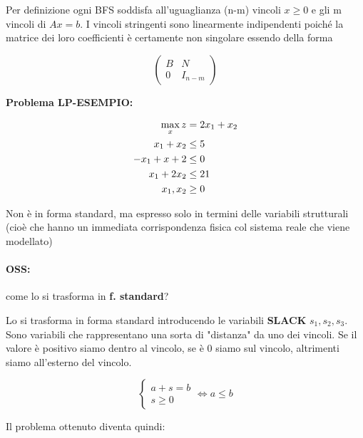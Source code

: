 \documentclass[a4paper, 11pt]{article}
\begin{document}
            Per definizione ogni BFS soddisfa all’uguaglianza (n-m) vincoli $x \geq 0$ e gli m
            vincoli di $Ax = b$. I vincoli stringenti sono linearmente indipendenti poiché la matrice dei loro coefficienti è certamente non singolare essendo della forma
            

            \[
                \begin{pmatrix}
                    B & N \\
                    0 & I_{n-m}
                \end{pmatrix}
            \]

            \textbf{Problema LP-ESEMPIO: }

            \begin{align}
                \max_{x} z &= 2x_1+x_2 \notag \\
                x_1 + x_2 &\leq 5 \notag \\
                -x_1 + x+2 &\leq 0 \notag \\
                x_1 + 2x_2 &\leq 21 \notag \\
                x_1, x_2 &\geq 0 \notag 
            \end{align}

            Non è in forma standard, ma espresso solo in termini delle variabili strutturali (cioè che hanno un immediata corrispondenza
            fisica col sistema reale che viene modellato)

            \paragraph{OSS: } come lo si trasforma in \textbf{f. standard}? 

            Lo si trasforma in forma standard introducendo le variabili \textbf{SLACK} $s_1, s_2, s_3$. Sono variabili che rappresentano una sorta di "distanza" da uno dei vincoli. Se il valore è positivo siamo dentro al vincolo, se è 0 siamo sul vincolo, altrimenti siamo all'esterno del vincolo.

            \[
                \begin{cases}
                    a+s = b \\
                    s \geq 0
                \end{cases}
                \iff a \leq b 
            \]            
            
            Il problema ottenuto diventa quindi:
\end{document}
